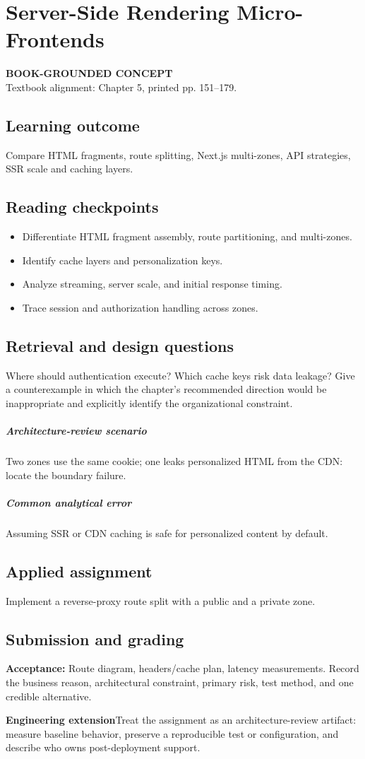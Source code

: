 \documentclass[11pt,letterpaper,oneside]{report}
\newcommand{\based}[1]{\begin{sourcebox}\textbf{BOOK-GROUNDED CONCEPT}\\#1\end{sourcebox}}
\newcommand{\criterion}[1]{\textbf{Acceptance:} #1}
\begin{document}
\chapter{Server-Side Rendering Micro-Frontends}
\based{Textbook alignment: Chapter 5, printed pp. 151--179.}
\section{Learning outcome}
Compare HTML fragments, route splitting, Next.js multi-zones, API strategies, SSR scale and caching layers.
\section{Reading checkpoints}
\begin{itemize}\item Differentiate HTML fragment assembly, route partitioning, and multi-zones.
\item Identify cache layers and personalization keys.
\item Analyze streaming, server scale, and initial response timing.
\item Trace session and authorization handling across zones.
\end{itemize}
\section{Retrieval and design questions}
Where should authentication execute? Which cache keys risk data leakage? Give a counterexample in which the chapter's recommended direction would be inappropriate and explicitly identify the organizational constraint.
\paragraph{Architecture-review scenario} Two zones use the same cookie; one leaks personalized HTML from the CDN: locate the boundary failure.
\paragraph{Common analytical error} Assuming SSR or CDN caching is safe for personalized content by default.
\section{Applied assignment}
Implement a reverse-proxy route split with a public and a private zone.
\section{Submission and grading}
\criterion{Route diagram, headers/cache plan, latency measurements. Record the business reason, architectural constraint, primary risk, test method, and one credible alternative.}
\begin{engineerbox}\textbf{Engineering extension}\newline Treat the assignment as an architecture-review artifact: measure baseline behavior, preserve a reproducible test or configuration, and describe who owns post-deployment support.\end{engineerbox}
\end{document}
